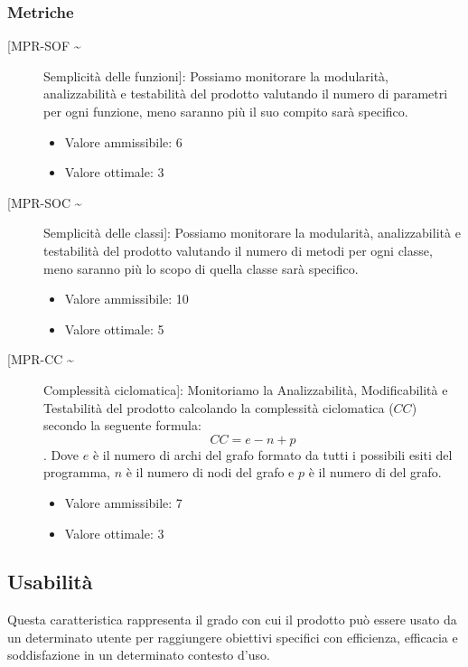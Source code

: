 \documentclass[../piano-di-qualifica.tex]{subfiles}
\begin{document}
\subsubsection{Metriche}%
\label{subs:metriche}
\begin{description}
  \item [[MPR-SOF \textasciitilde] Semplicità delle funzioni]: Possiamo monitorare la modularità, analizzabilità e testabilità del prodotto valutando il numero di parametri per ogni funzione, meno saranno più il suo compito sarà specifico.
        \begin{itemize}   \item Valore ammissibile: \leq{}  6 \item Valore ottimale: \leq{}  3 \end{itemize}
  \item [[MPR-SOC \textasciitilde] Semplicità delle classi]: Possiamo monitorare la modularità, analizzabilità e testabilità del prodotto valutando il numero di metodi per ogni classe, meno saranno più lo scopo di quella classe sarà specifico.
        \begin{itemize} \item Valore ammissibile: \leq{}  10 \item Valore ottimale: \leq{}  5 \end{itemize}
  \item [[MPR-CC \textasciitilde] Complessità ciclomatica]: Monitoriamo la Analizzabilità, Modificabilità e Testabilità del prodotto calcolando la complessità ciclomatica (\(CC\)) secondo la seguente formula: \begin{equation} CC = e - n + p \end{equation}. Dove \(e\) è il numero di archi del grafo formato da tutti i possibili esiti del programma, \(n\) è il numero di nodi del grafo e \(p\) è il numero di  del grafo.
        \begin{itemize} \item Valore ammissibile: \leq{}  7 \item Valore ottimale: \leq{}  3 \end{itemize}
\end{description}


\subsection{Usabilità}%
\label{sub:usabilita}
Questa caratteristica rappresenta il grado con cui il prodotto può essere usato da un determinato utente per raggiungere obiettivi specifici con efficienza, efficacia e soddisfazione in un determinato contesto d'uso.
\end{document}
